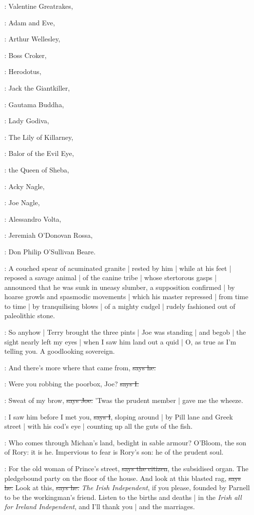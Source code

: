 :
Valentine Greatrakes,

:
Adam and Eve,

:
Arthur Wellesley,

:
Boss Croker,

:
Herodotus,

:
Jack the Giantkiller,

:
Gautama Buddha,

:
Lady Godiva,

:
The Lily of Killarney,

:
Balor of the Evil Eye,

:
the Queen of Sheba,

:
Acky Nagle,

:
Joe Nagle,

:
Alessandro Volta,

:
Jeremiah O'Donovan Rossa,

:
Don Philip O'Sullivan Beare.

:
A couched spear of acuminated granite |
rested by him |
while at his feet |
reposed a savage animal |
of the canine tribe |
whose stertorous gasps |
announced that he was sunk in uneasy slumber,
a supposition confirmed |
by hoarse growls and spasmodic movements |
which his master repressed |
from time to time |
by tranquilising blows |
of a mighty cudgel |
rudely fashioned out of paleolithic stone.

\Nq:
So anyhow |
Terry brought the three pints |
Joe was standing |
and begob |
the sight nearly left my eyes |
when I saw him land out a quid |
O,
as true as I'm telling you.
A goodlooking sovereign.

\joe:
And there's more where that came from,
\sout{says he.}

:
Were you robbing the poorbox,
Joe?
\sout{says I.}

\joe:
Sweat of my brow,
\sout{says Joe.}
'Twas the prudent member |
gave me the wheeze.

:
I saw him before I met you,
\sout{says I},
sloping around |
by Pill lane and Greek street |
with his cod's eye |
counting up all the guts of the fish.

:
Who comes through Michan's land,
bedight in sable armour?
O'Bloom,
the son of Rory:
it is he.
Impervious to fear is Rory's son:
he of the prudent soul.

\citizen:
For the old woman of Prince's street,
\sout{says the citizen},
the subsidised organ.
The pledgebound party on the floor of the house.
And look at this blasted rag,
\sout{says he.}
Look at this,
\sout{says he.}
\emph{The Irish Independent},
if you please,
founded by Parnell to be the workingman's friend.
Listen to the births and deaths |
in the \emph{Irish all for Ireland Independent},
and I'll thank you |
and the marriages.

